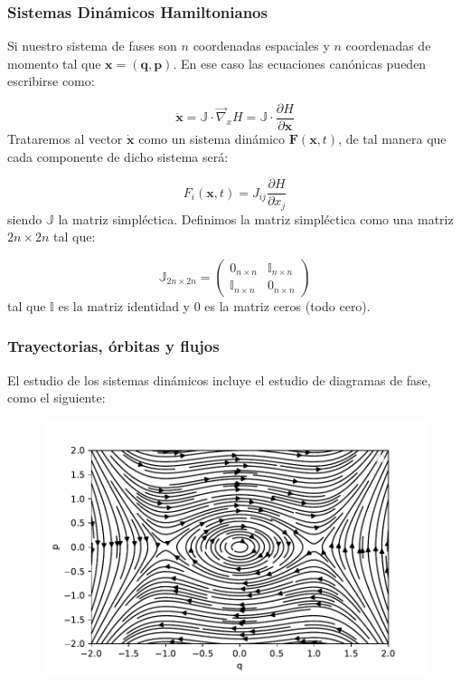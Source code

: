 \documentclass[12pt,a4paper]{article}
\numberwithin{equation}{section}
\numberwithin{figure}{section}
\newcommand{\parciales}[2]{\frac{\partial #1}{\partial #2}}
\newcommand{\xn}{\mathbf{x}}
\newcommand{\pn}{\mathbf{p}}
\newcommand{\qn}{\mathbf{q}}
\newcommand{\Fn}{\mathbf{F}}
\begin{document}
\subsubsection{Sistemas Dinámicos Hamiltonianos}

Si nuestro sistema de fases son $n$ coordenadas espaciales y $n$ coordenadas de momento tal que $\xn = (\qn,\pn)$. En ese caso las ecuaciones canónicas pueden escribirse como:

\begin{equation}
\dot{\xn} = \mathbb{J} \cdot \vec{\nabla}_x H = \mathbb{J} \cdot \parciales{H}{\xn}
\end{equation}
Trataremos al vector $\dot{\xn}$ como un sistema dinámico $\Fn(\xn,t)$, de tal manera que cada componente de dicho sistema será:

\begin{equation}
F_i (\xn,t) = J_{ij} \parciales{H}{x_j}
\end{equation}
siendo $\mathbb{J}$ la matriz simpléctica. Definimos la matriz simpléctica como una matriz $2n \times 2n $ tal que:

\begin{equation}
\mathbb{J}_{2n \times 2n} = \begin{pmatrix}
0_{n \times n} & \mathbb{I}_{n \times n} \\
\mathbb{I}_{n \times n} & 0_{n \times n}
\end{pmatrix}
\end{equation}
tal que $\mathbb{I}$ es la matriz identidad y $0$ es la matriz ceros (todo cero).
\subsubsection{Trayectorias, órbitas y flujos}

El estudio de los sistemas dinámicos incluye el estudio de diagramas de fase, como el siguiente:

\begin{figure}[h!] \centering
\includegraphics[scale=1]{Ejercicio-23a.pdf}
\end{figure}
\end{document}
